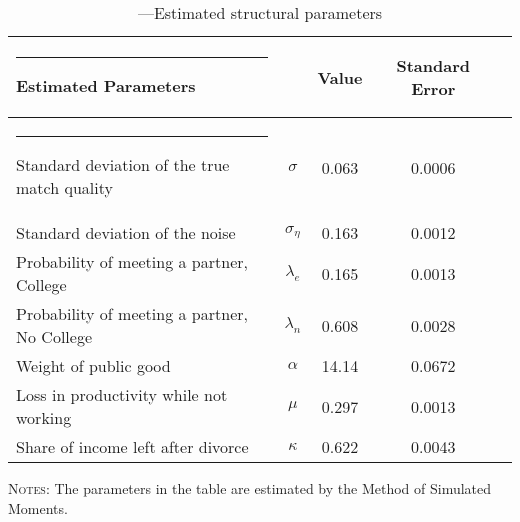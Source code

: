 \documentclass[12pt]{article}
\begin{document}
 \begin{table}[h!]
 	\caption{---Estimated structural parameters} %
 	\label{table:structural_params}
 	\centering %
 	\begin{threeparttable}
 		\begin{tabular}{@{\extracolsep{5pt}}lcccc}   %
 			\hline \hline%
 			\rule{-4pt}{2.5ex}    
 			
 			Estimated Parameters &  & Value & Standard Error  \\ [0.15ex] %
 			\hline
 			\rule{-4pt}{2.5ex}
 			Standard deviation of the true match quality         & $\sigma$  & 0.063 &  0.0006 & \\[0.15ex]
 			Standard deviation of the noise & $\sigma_{\eta}$         & 0.163  &  0.0012& \\[0.15ex]
 			Probability of meeting a partner, College               & $\lambda_e$       & 0.165 & 0.0013 & \\[0.15ex]
 			Probability of meeting a partner, No College               & $\lambda_n$       & 0.608 & 0.0028 &  \\[0.15ex]
 			Weight of public good               & $\alpha$             & 14.14 & 0.0672 & \\[0.15ex]
 			Loss in productivity while not working               & $\mu$             & 0.297 & 0.0013& \\[0.15ex]
 			Share of income left after divorce         &$\kappa$   & 0.622& 0.0043 & \\[0.15ex]
 			\hline
 		\end{tabular}
 		\begin{tablenotes}[flushleft]
 			\footnotesize{\item \textsc{Notes}: The parameters in the table are estimated by the Method of Simulated Moments.}
 		\end{tablenotes}
 	\end{threeparttable}
 \end{table}
\end{document}
